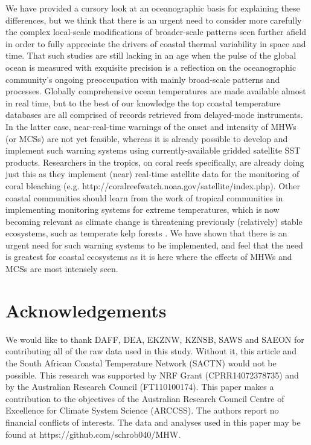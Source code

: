 \documentclass[a4paper,10pt,review]{elsarticle}
\begin{document}
We have provided a cursory look at an oceanographic basis for explaining these differences, but we think that there is an urgent need to consider more carefully the complex local-scale modifications of broader-scale patterns seen further afield in order to fully appreciate the drivers of coastal thermal variability in space and time. That such studies are still lacking in an age when the pulse of the global ocean is measured with exquisite precision is a reflection on the oceanographic community's ongoing preoccupation with mainly broad-scale patterns and processes. Globally comprehensive ocean temperatures are made available almost in real time, but to the best of our knowledge the top coastal temperature databases are all comprised of records retrieved from delayed-mode instruments. In the latter case, near-real-time warnings of the onset and intensity of MHWs (or MCSs) are not yet feasible, whereas it is already possible to develop and implement such warning systems using currently-available gridded satellite SST products. Researchers in the tropics, on coral reefs specifically, are already doing just this as they implement (near) real-time satellite data for the monitoring of coral bleaching (e.g. http://coralreefwatch.noaa.gov/satellite/index.php). Other coastal communities should learn from the work of tropical communities in implementing monitoring systems for extreme temperatures, which is now becoming relevant as climate change is threatening previously (relatively) stable ecosystems, such as temperate kelp forests \citep{Wernberg2013}. We have shown that there is an urgent need for such warning systems to be implemented, and feel that the need is greatest for coastal ecosystems as it is here where the effects of MHWs and MCSs are most intensely seen.

\section*{Acknowledgements}
We would like to thank DAFF, DEA, EKZNW, KZNSB, SAWS and SAEON for contributing all of the raw data used in this study. Without it, this article and the South African Coastal Temperature Network (SACTN) would not be possible. This research was supported by NRF Grant (CPRR14072378735) and by the Australian Research Council (FT110100174). This paper makes a contribution to the objectives of the Australian Research Council Centre of Excellence for Climate System Science (ARCCSS). The authors report no financial conflicts of interests. The data and analyses used in this paper may be found at https://github.com/schrob040/MHW.
\end{document}
